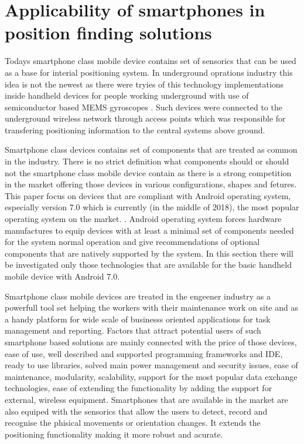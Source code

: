 \documentclass[../main.tex]{subfiles}
\begin{document}
\section{Applicability of smartphones in position finding solutions} %
\label{sec:mobile_device_dedicated_positioning_systems}

Todays smartphone class mobile device contains set of sensorics that can be used as a base for interial positioning system. In underground oprations industry this idea is not the newest as there were tryies of this technology implementations inside handheld devices for people working underground with use of semiconductor based MEMS gyroscopes \cite{Thesis_CM}. Such devices were connected to the underground wireless network through access points which was responsible for transfering positioning information to the central systems above ground.

Smartphone class devices contains set of components that are treated as common in the industry. There is no strict definition what components should or should not the smartphone class mobile device contain as there is a strong competition in the market offering those devices in various configurations, shapes and fetures. This paper focus on devices that are compliant with Android operating system, especially version 7.0 which is currently (in the middle of 2018), the most popular operating system on the market. \cite{android7.0_cdd}. Android operating system forces hardware manufactures to equip devices with at least a minimal set of components needed for the system normal operation and give recommendations of optional components that are natively supported by the system\cite{android7.0_cdd}. In this section there will be investigated only those technologies that are available for the basic handheld mobile device with Android 7.0.

Smartphone class mobile devices are treated in the engeener industry as a powerfull tool set helping the workers with their maintenance work on site and as a handy platform for wide scale of businesss oriented applications for task management and reporting. Factors that attract potential users of such smartphone based solutions are mainly connected with the price of those devices, ease of use, well described and supported programming frameworks and IDE, ready to use libraries, solved main power management and security issues, ease of maintenance, modularity, scalability, support for the most popular data exchange technologies, ease of extending the functionality by adding the support for external, wireless equipment. Smartphones that are available in the market are also equiped with the sensorics that allow the users to detect, record and recognise the phisical movements or orientation changes. It extends the positioning functionality making it more robust and acurate\cite{article_Inertial-sensors-for-smartphones}.
\end{document}

